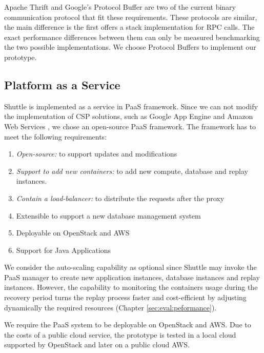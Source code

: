 Apache Thrift \cite{Thrift} and Google's Protocol Buffer \cite{protobuffers} are two of the current binary communication protocol that fit these requirements. These protocols are similar, the main difference is the first offers a stack implementation for \acf{RPC} calls. The exact performance differences between them can only be measured benchmarking the two possible implementations. We choose Protocol Buffers to implement our prototype.



\subsection{Platform as a Service}\label{sec:impl:paas}
Shuttle is implemented as a service in \ac{PaaS} framework. Since we can not modify the implementation of \ac{CSP} solutions, such as Google App Engine \cite{GoogleAppEngine} and Amazon Web Services \cite{AmazonElasticBeanstalk}, we chose an open-source \ac{PaaS} framework. The framework has to meet the following requirements: 

\begin{enumerate}
	\item \textit{Open-source:} to support updates and modifications
	\item \textit{Support to add new containers:} to add new compute, database and replay instances.
	\item \textit{Contain a load-balancer:} to distribute the requests after the proxy
	\item Extensible to support a new database management system
	\item Deployable on OpenStack and \acf{AWS}
	\item Support for Java Applications
\end{enumerate}

We consider the auto-scaling capability as optional since Shuttle may invoke the \ac{PaaS} manager to create new application instances, database instances and replay instances. However, the capability to monitoring the containers usage during the recovery period turns the replay process faster and cost-efficient by adjusting dynamically the required resources (Chapter \ref{sec:eval:peformance}). 

We require the \ac{PaaS} system to be deployable on OpenStack \cite{openstack} and \acf{AWS}. Due to the costs of a public cloud service, the prototype is tested in a local cloud supported by OpenStack and later on a public cloud \ac{AWS}.


